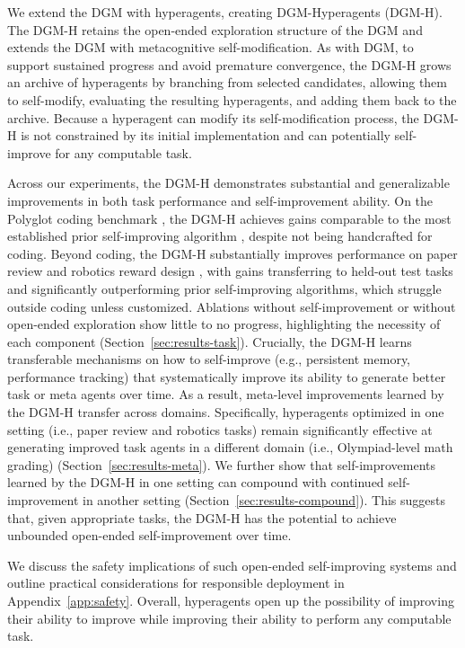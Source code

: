 We extend the DGM with hyperagents, creating DGM-Hyperagents (DGM-H). The DGM-H retains the open-ended exploration structure of the DGM and extends the DGM with metacognitive self-modification. As with DGM, to support sustained progress and avoid premature convergence, the DGM-H grows an archive of hyperagents by branching from selected candidates, allowing them to self-modify, evaluating the resulting hyperagents, and adding them back to the archive. Because a hyperagent can modify its self-modification process, the DGM-H is not constrained by its initial implementation and can potentially self-improve for any computable task.

Across our experiments, the DGM-H demonstrates substantial and generalizable improvements in both task performance and self-improvement ability. On the Polyglot coding benchmark \citep{gauthier2024polyglot}, the DGM-H achieves gains comparable to the most established prior self-improving algorithm \citep[the Darwin G\"{o}del Machine,][]{zhang2025darwin}, despite not being handcrafted for coding. Beyond coding, the DGM-H substantially improves performance on paper review \citep{zhao2026apres} and robotics reward design \citep{genesis2024}, with gains transferring to held-out test tasks and significantly outperforming prior self-improving algorithms, which struggle outside coding unless customized. Ablations without self-improvement or without open-ended exploration show little to no progress, highlighting the necessity of each component (Section~\ref{sec:results-task}). Crucially, the DGM-H learns transferable mechanisms on how to self-improve (e.g., persistent memory, performance tracking) that systematically improve its ability to generate better task or meta agents over time. As a result, meta-level improvements learned by the DGM-H transfer across domains. Specifically, hyperagents optimized in one setting (i.e., paper review and robotics tasks) remain significantly effective at generating improved task agents in a different domain (i.e., Olympiad-level math grading) (Section~\ref{sec:results-meta}). We further show that self-improvements learned by the DGM-H in one setting can compound with continued self-improvement in another setting (Section~\ref{sec:results-compound}). This suggests that, given appropriate tasks, the DGM-H has the potential to achieve unbounded open-ended self-improvement over time.

We discuss the safety implications of such open-ended self-improving systems and outline practical considerations for responsible deployment in Appendix~\ref{app:safety}. Overall, hyperagents open up the possibility of improving their ability to improve while improving their ability to perform any computable task.

